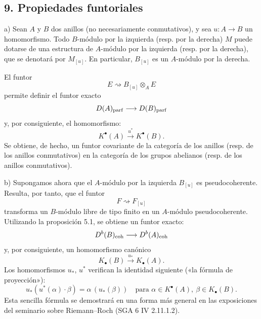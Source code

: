 \subsection*{9. Propiedades funtoriales}

a) Sean $A$ y $B$ dos anillos (no necesariamente conmutativos), y sea $u:A\to B$ un homomorfismo. Todo $B$-módulo por la izquierda (resp. por la derecha) $M$ puede dotarse de una estructura de $A$-módulo por la izquierda (resp. por la derecha), que se denotará por $M_{[u]}$. En particular, $B_{[u]}$ es un $A$-módulo por la derecha.

El funtor
\[
E\rightsquigarrow B_{[u]}\otimes_A E
\]
permite definir el funtor exacto
\[
D(A)_{\mathrm{parf}}\longrightarrow D(B)_{\mathrm{parf}}
\]
y, por consiguiente, el homomorfismo:
\[
K^{\bullet}(A)\xrightarrow{u^*}K^{\bullet}(B).
\]
Se obtiene, de hecho, un funtor covariante de la categoría de los anillos (resp. de los anillos conmutativos) en la categoría de los grupos abelianos (resp. de los anillos conmutativos).

b) Supongamos ahora que el $A$-módulo por la izquierda $B_{[u]}$ es pseudocoherente. Resulta, por tanto, que el funtor
\[
F\rightsquigarrow F_{[u]}
\]
transforma un $B$-módulo libre de tipo finito en un $A$-módulo pseudocoherente. Utilizando la proposición 5.1, se obtiene un funtor exacto:
\[
D^b(B)_{\mathrm{coh}}\longrightarrow D^b(A)_{\mathrm{coh}}
\]
y, por consiguiente, un homomorfismo canónico
\[
K_\bullet(B)\xrightarrow{u_*}K_\bullet(A).
\]
Los homomorfismos $u_*$, $u^*$ verifican la identidad siguiente («la fórmula de proyección»):
\[
u_*(u^*(\alpha)\cdot \beta)=\alpha\,(u_*(\beta))
\quad\text{para }\alpha\in K^{\bullet}(A),\ \beta\in K_\bullet(B).
\]
Esta sencilla fórmula se demostrará en una forma más general en las exposiciones del seminario sobre Riemann--Roch (SGA 6 IV 2.11.1.2).
